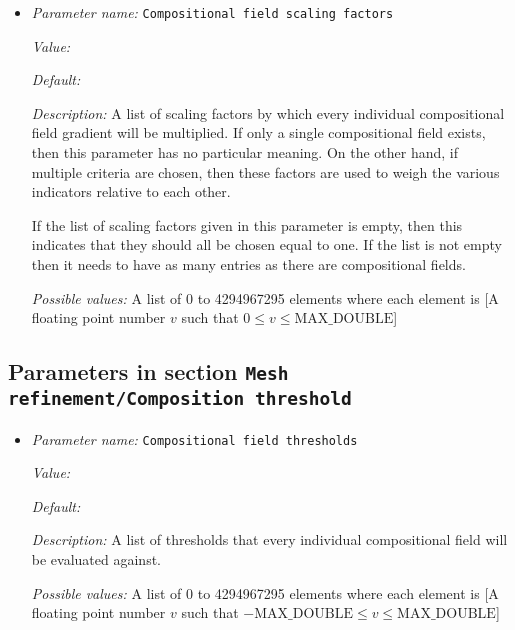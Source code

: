 \begin{itemize}
\item {\it Parameter name:} {\tt Compositional field scaling factors}
\label{parameters:Mesh refinement/Composition gradient/Compositional field scaling factors}


{\it Value:} 


{\it Default:} 


{\it Description:} A list of scaling factors by which every individual compositional field gradient will be multiplied. If only a single compositional field exists, then this parameter has no particular meaning. On the other hand, if multiple criteria are chosen, then these factors are used to weigh the various indicators relative to each other. 

If the list of scaling factors given in this parameter is empty, then this indicates that they should all be chosen equal to one. If the list is not empty then it needs to have as many entries as there are compositional fields.


{\it Possible values:} A list of 0 to 4294967295 elements where each element is [A floating point number $v$ such that $0 \leq v \leq \text{MAX\_DOUBLE}$]
\end{itemize}

\subsection{Parameters in section \tt Mesh refinement/Composition threshold}
\label{parameters:Mesh_20refinement/Composition_20threshold}

\begin{itemize}
\item {\it Parameter name:} {\tt Compositional field thresholds}
\label{parameters:Mesh refinement/Composition threshold/Compositional field thresholds}


{\it Value:} 


{\it Default:} 


{\it Description:} A list of thresholds that every individual compositional field will be evaluated against.


{\it Possible values:} A list of 0 to 4294967295 elements where each element is [A floating point number $v$ such that $-\text{MAX\_DOUBLE} \leq v \leq \text{MAX\_DOUBLE}$]
\end{itemize}

